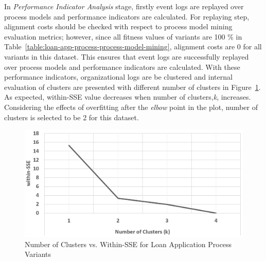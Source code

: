In \textit{Performance Indicator Analysis} stage, firstly event logs are replayed over process models and performance indicators are calculated. For replaying step, alignment costs should be checked with respect to process model mining evaluation metrics; however, since all fitness values of variants are 100 \% in Table~\ref{table:loan-app-process-process-model-mining}, alignment costs are 0 for all variants in this dataset. This ensures that event logs are successfully replayed over process models and performance indicators are calculated. With these performance indicators, organizational logs are be clustered and internal evaluation of clusters are presented with different number of clusters in Figure~\ref{fig:loan-cluster-sse-plot}. As expected, within-SSE value decreases when number of clusters,\textit{k}, increases. Considering the effects of overfitting after the \textit{elbow} point in the plot, number of clusters is selected to be 2 for this dataset.
\begin{figure}
	\centering
	\includegraphics[width=\textwidth]{5_results_discussions/loan-application-process/cluster-sse-plot}
	\caption{Number of Clusters vs. Within-SSE for Loan Application Process Variants}
  \label{fig:loan-cluster-sse-plot}
\end{figure}

